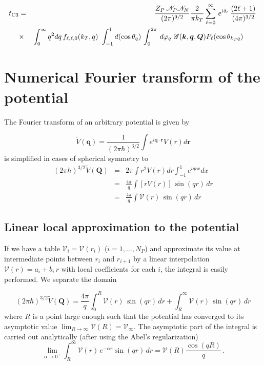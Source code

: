 \begin{eqnarray}\label{Q:ap12}
t_{{\rm C3}} &=& \frac{Z_{P} \, \mathcal{N}_{P}
\mathcal{N}_{N}}{(2\pi)^{9/2}} \frac{2}{\pi k_{T}}
\sum_{\ell=0}^{\infty} \, e^{i \delta_{\ell}} \,\frac{(2 \ell +
1)}{(4 \pi)^{3/2}} \,
\\
&{\times}&
 \int_{0}^{\infty} q^{2} d q \, f_{\ell,\ell,0}(k_{T},q) \
\int_{-1}^{1}d (\cos \theta_{q}) \,  \int_{0}^{2 \pi} \,d
\varphi_{q}\ \mathcal{G}(\bm{k},\bm{q},\bm{Q}) P_{\ell}(\cos
\theta_{k_{T}q}) \qquad \nonumber
\end{eqnarray}


\section{Numerical Fourier transform of the potential}

The Fourier transform of an arbitrary potential is given by

\[
\tilde{V}(\bm{q}) = \frac{1}{(2 \pi \hbar)^{3/2}} \int e^{i
\bm{q} \cdot \bm{r}} V(r) d \bm{r}
\]
is simplified in cases of spherical symmetry to
\begin{eqnarray*}
(2 \pi \hbar)^{3/2} \tilde{V}(\bm{Q}) &=& 2 \pi \int r^{2} V(r) d r
\int_{-1}^{1} e^{i q r x} d x \\
&=& \frac{4 \pi}{q} \int \left[ r V(r) \right] \, \sin{(q r)}\, d r
\\
&=& \frac{4 \pi}{q} \int \mathcal{V}(r) \, \sin{(q r)}\, d r
\end{eqnarray*}

\subsection{Linear local approximation to the potential}

If we have a table $\mathcal{V}_{i}= \mathcal{V}(r_{i}) $ ($i=1,
\ldots, N_{P}$) and approximate its value at intermediate points
between $r_{i}$ and $r_{i+1}$ by a linear interpolation
$\mathcal{V}(r)= a_{i} + b_{i}\,r$ with local coefficients for each
$i$, the integral is easily performed. We separate the domain

\[
(2 \pi \hbar)^{3/2} \tilde{V}(\bm{Q}) = \frac{4 \pi}{q} \int_{0}^{R}
\mathcal{V}(r) \, \sin{(q r)}\, d r + \int_{R}^{\infty}
\mathcal{V}(r) \, \sin{(q r)}\, d r
\]
where $R$ is a point large enough such that the potential has converged
to its asymptotic value $\lim_{R \to \infty} \mathcal{V}(R) =
\mathcal{V}_{\infty}$. The asymptotic part of the integral is carried
out analytically (after using the Abel's regularization)
\begin{equation}\label{Q:apFTV1}
\lim_{\alpha \to 0^{+}} \int_{R}^{\infty} \mathcal{V}(r) \,e^{-
\alpha r} \sin{(q r)}\, d r = \mathcal{V}(R) \frac{\cos{(q R)}}{q}
\, .
\end{equation}

